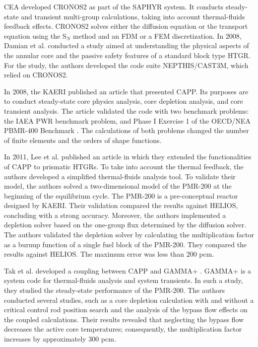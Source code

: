 \gls{CEA} developed CRONOS2 \cite{lautard_cronos_1990} as part of the SAPHYR system.
It conducts steady-state and transient multi-group calculations, taking into account thermal-fluids feedback effects.
CRONOS2 solves either the diffusion equation or the transport equation using the S$_N$ method and an \gls{FDM} or a \gls{FEM} discretization.
In 2008, Damian et al. \cite{damian_vhtr_2008} conducted a study aimed at understanding the physical aspects of the annular core and the passive safety features of a standard block type \gls{HTGR}.
For the study, the authors developed the code suite NEPTHIS/CAST3M, which relied on CRONOS2.

In 2008, the \gls{KAERI} published an article \cite{lee_development_2008} that presented CAPP.
Its purposes are to conduct steady-state core physics analysis, core depletion analysis, and core transient analysis.
The article validated the code with two benchmark problems: the IAEA PWR benchmark problem, and Phase I Exercise 1 of the OECD/NEA PBMR-400 Benchmark \cite{reitsma_oecd-neansc_2008}.
The calculations of both problems changed the number of finite elements and the orders of shape functions.

In 2011, Lee et al. published an article \cite{lee_development_2011} in which they extended the functionalities of CAPP to prismatic \glspl{HTGR}.
To take into account the thermal feedback, the authors developed a simplified thermal-fluids analysis tool.
To validate their model, the authors solved a two-dimensional model of the PMR-200 at the beginning of the equilibrium cycle.
The PMR-200 is a pre-conceptual reactor designed by \gls{KAERI}.
Their validation compared the results against HELIOS\cite{stammler_helios_1998}, concluding with a strong accuracy.
Moreover, the authors implemented a depletion solver based on the one-group flux determined by the diffusion solver.
The authors validated the depletion solver by calculating the multiplication factor as a burnup function of a single fuel block of the PMR-200.
They compared the results against HELIOS.
The maximum error was less than 200 pcm.

Tak et al. \cite{tak_cappgamma_2016} developed a coupling between CAPP and GAMMA+ \cite{lim_gamma_2006}.
GAMMA+ is a system code for thermal-fluids analysis and system transients.
In such a study, they studied the steady-state performance of the PMR-200.
The authors conducted several studies, such as a core depletion calculation with and without a critical control rod position search and the analysis of the bypass flow effects on the coupled calculations.
Their results revealed that neglecting the bypass flow decreases the active core temperatures; consequently, the multiplication factor increases by approximately 300 pcm.

